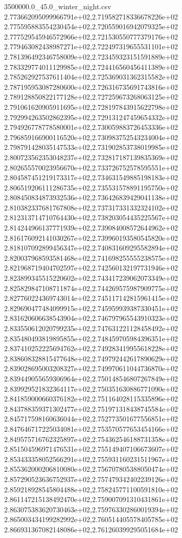 \begin{filecontents*}{3500000.0_45.0_winter_night.csv}
2.773662095099966791e+02,2.719582718336678226e+02
2.775595883554230454e+02,2.720559016942079325e+02
2.777529545946572966e+02,2.721530550777379176e+02
2.779463082438987271e+02,2.722497319655531101e+02
2.781396492346758009e+02,2.723459323151591889e+02
2.783329774011129985e+02,2.724416560456411389e+02
2.785262927537611404e+02,2.725369031362315582e+02
2.787195953087280600e+02,2.726316735691743816e+02
2.789128850822177128e+02,2.727259673268063125e+02
2.791061620905911695e+02,2.728197843915622798e+02
2.792994263502862395e+02,2.729131247459654332e+02
2.794926778778580001e+02,2.730059883726453336e+02
2.796859166900116520e+02,2.730983752543234004e+02
2.798791428035147533e+02,2.731902853738019985e+02
2.800723562353048237e+02,2.732817187139835369e+02
2.802655570023956670e+02,2.733726752578595551e+02
2.804587451219173317e+02,2.734631549885198183e+02
2.806519206111286735e+02,2.735531578891195750e+02
2.808450834873932536e+02,2.736426839429041138e+02
2.810382337681767808e+02,2.737317331332324102e+02
2.812313714710764430e+02,2.738203054435225567e+02
2.814244966137771939e+02,2.739084008572644962e+02
2.816176092141030267e+02,2.739960193580545820e+02
2.818107092899456347e+02,2.740831609295582894e+02
2.820037968593581468e+02,2.741698255555238575e+02
2.821968719404702597e+02,2.742560132197731946e+02
2.823899345515220602e+02,2.743417239062073349e+02
2.825829847108711874e+02,2.744269575987909775e+02
2.827760224369743014e+02,2.745117142815961415e+02
2.829690477484099915e+02,2.745959939387330451e+02
2.831620606638543904e+02,2.746797965543910323e+02
2.833550612020799235e+02,2.747631221128458492e+02
2.835480493819895855e+02,2.748459705984396351e+02
2.837410252225694762e+02,2.749283419955618228e+02
2.838608328815477648e+02,2.749792442617890629e+02
2.839028695003208327e+02,2.749970611044736870e+02
2.839449055659306964e+02,2.750148546807267849e+02
2.839929521832364117e+02,2.750351630886771090e+02
2.841859000660376182e+02,2.751164028115335896e+02
2.843788359371302477e+02,2.751971318438745584e+02
2.845717598160636044e+02,2.752773501677556851e+02
2.847646717225034081e+02,2.753570577653454166e+02
2.849575716762325897e+02,2.754362546188731358e+02
2.851504596971476531e+02,2.755149407106673607e+02
2.853433358052566291e+02,2.755931160231511967e+02
2.855362000206810080e+02,2.756707805388050474e+02
2.857290523636752937e+02,2.757479342402239126e+02
2.859218928545804488e+02,2.758245771100591810e+02
2.861147215138492470e+02,2.759007091310431861e+02
2.863075383620730463e+02,2.759763302860019394e+02
2.865003434199282992e+02,2.760514405578405785e+02
2.866931367082148086e+02,2.761260399295051684e+02

\end{filecontents*}

